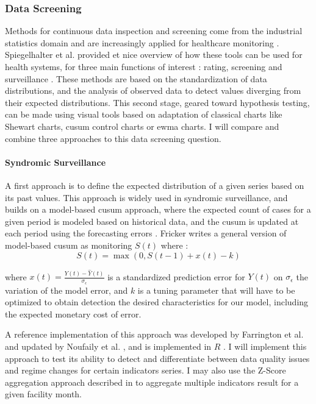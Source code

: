 \subsubsection{Data Screening}
\label{sec:data_screening}

Methods for continuous data inspection and screening come from the industrial statistics domain and are increasingly applied for healthcare monitoring \citep{woodall_use_2006,woodall_current_2014}. Spiegelhalter et al. provided et nice overview of how these tools can be used for health systems, for three main functions of interest : rating, screening and surveillance \citep{spiegelhalter_statistical_2012}. These methods are based on the standardization of data distributions, and the analysis of observed data to detect values diverging from their expected distributions. This second stage, geared toward hypothesis testing, can be made using visual tools based on adaptation of classical charts like Shewart charts, \gls{cusum} control charts or \gls{ewma} charts. I will compare and combine three approaches to this data screening question.

\paragraph{Syndromic Surveillance} A first approach is to define the expected distribution of a given series based on its past values. This approach is widely used in syndromic surveillance, and builds on a model-based \gls{cusum} approach, where the expected count of cases for a given period is modeled based on historical data, and the \gls{cusum} is updated at each period using the forecasting errors \citep{fricker_comparing_2008}. Fricker writes a general version of model-based \gls{cusum} as monitoring $S(t)$ where :
$$ S(t) = \max(0 , S(t-1) + x(t) - k)$$

where $x(t) = \frac{Y(t) - \hat{Y}(t)}{\sigma_\epsilon}$ is a standardized prediction error for $Y(t)$ on $\sigma_\epsilon$ the variation of the model error, and $k$ is a tuning parameter that will have to be optimized to obtain detection the desired characteristics for our model, including the expected monetary cost of error.

A reference implementation of this approach was developed by Farrington et al. \citep{farrington_statistical_1996} and updated by Noufaily et al. \citep{noufaily_improved_2013}, and is implemented in $R$ \citep{salmon_advances_2016}. I will implement this approach to test its ability to detect and differentiate between data quality issues and regime changes for certain indicators series. I may also use the Z-Score aggregation approach described in \citep{bardsley_using_2009} to aggregate multiple indicators result for a given facility month.


